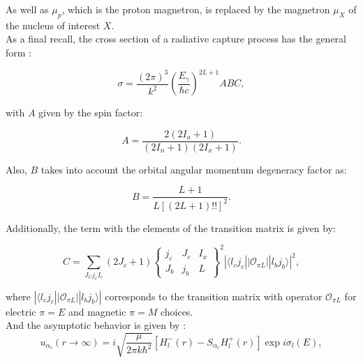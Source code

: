 \documentclass[openany]{book}
\begin{document}
As well as $\mu_p$, which is the proton magnetron, is replaced by the magnetron $\mu_X$ of the nucleus of interest $X$. \\


As a final recall, the cross section of a radiative capture process has the general form \cite{huang_bertulani_guimaraes_2010}:

\begin{equation}\label{eq:potential_radiativeCapture}
	\sigma = \frac{(2\pi)^3}{k^2} \left(\frac{E_\gamma}{\hbar c}\right)^{2L + 1} ABC,
\end{equation}

with $A$ given by the spin factor:

\begin{equation}\label{eq:potential_radiativeCapture_A}
	A = \frac{2(2I_a + 1)}{(2I_n + 1)(2I_x + 1)}.
\end{equation}

Also, $B$ takes into account the orbital angular momentum degeneracy factor as: 

\begin{equation}\label{eq:potential_radiativeCapture_B}
	B =  \frac{L+1}{L[(2L+1)!!]^2}.
\end{equation}

Additionally, the term with the elements of the transition matrix is given by:

\begin{equation}\label{eq:potential_radiativeCapture_C}
	C =  \sum_{J_Cj_cI_c} (2J_c + 1) \left \{  \begin{matrix}
		j_c & J_c & I_x \\
		J_b & j_b & L
	\end{matrix} \right \}^2 |\langle l_cj_c || \mathcal{O}_{\pi L} || l_b j_b \rangle|^2,
\end{equation}

where $|\langle l_cj_c || \mathcal{O}_{\pi L} || l_b j_b \rangle|$ corresponds to the transition matrix with operator $ \mathcal{O}_{\pi L}$ for electric $\pi = E$ and magnetic $\pi = M$ choices.\\

And the asymptotic behavior is given by \cite{huang_bertulani_guimaraes_2010}: \\

\begin{equation}\label{eq:potential_uc}
	u_{\alpha_c}(r \rightarrow \infty) = i \sqrt{\frac{\mu}{2\pi k \hbar^2}}[H^{-}_l(r) - S_{\alpha_c}H^{+}_l(r)]\exp {i\sigma_l(E)},
\end{equation}
\end{document}
